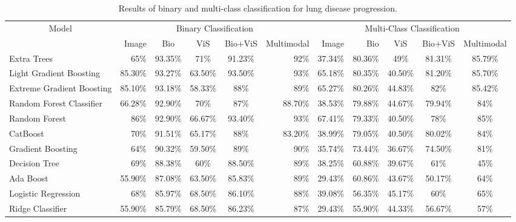 \documentclass[conference]{IEEEtran}
\begin{document}
\begin{table*}[]
\centering
\caption{Results of binary and multi-class classification for lung disease progression.}\label{binary_multi_mm}
\begin{tabular}{|l|r|c|c|c|r|r|r|c|c|c|}
\hline
\multicolumn{1}{|c|}{\multirow{2}{*}{Model}} & \multicolumn{5}{c|}{Binary Classification} & \multicolumn{5}{c|}{Multi-Class Classification} \\ \cline{2-11}  & Image & 
Bio & 
ViS & 
Bio+ViS & 
Multimodal & 
Image & 
Bio & 
ViS & 
Bio+ViS & 
Multimodal \\ \hline
Extra Trees \cite{geurts2006extremely} & 65\% & 93.35\% & 71\% & 91.23\% & 92\% & 37.34\% & 80.36\% & 49\% & 81.31\% & 85.79\% \\ \hline
Light Gradient Boosting \cite{hastie2009elements} & 85.30\% & 93.27\% & 63.50\% & 93.50\% & 93\% & 65.18\% & 80.35\% & 40.50\% & 81.20\% & 85.70\% \\ \hline
Extreme Gradient Boosting \cite{chen2016xgboost} & 85.10\% & 93.18\% & 58.33\% & 88\% & 89\% & 65.27\% & 80.26\% & 44.83\% & 82\% & 85.42\% \\ \hline
Random Forest Classifier & 66.28\% & 92.90\% & 70\% & 87\% & 88.70\% & 38.53\% & 79.88\% & 44.67\% & 79.94\% & 84\% \\ \hline
Random Forest \cite{breiman2001random} & 86\% & 92.90\% & 66.67\% & 93.40\% & 93\% & 67.41\% & 79.33\% & 40.50\% & 78\% & 85\% \\ \hline
CatBoost \cite{prokhorenkova2017catboost} & 70\% & 91.51\% & 65.17\% & 88\% & 83.20\% & 38.99\% & 79.05\% & 40.50\% & 80.02\% & 84\% \\ \hline
Gradient Boosting \cite{chen2016xgboost} & 64\% & 90.32\% & 59.50\% & 89\% & 90\% & 35.74\% & 73.44\% & 36.67\% & 74.50\% & 81\% \\ \hline
Decision Tree \cite{hastie2009elements} & 69\% & 88.38\% & 60\% & 88.50\% & 89\% & 38.25\% & 60.88\% & 39.67\% & 61\% & 45\% \\ \hline
Ada Boost \cite{hastie2009multi} & 55.90\% & 87.08\% & 63.50\% & 85.83\% & 89\% & 29.43\% & 60.86\% & 43.67\% & 50.17\% & 64\% \\ \hline
Logistic Regression \cite{defazio2014saga} & 68\% & 85.97\% & 68.50\% & 86.10\% & 88\% & 39.08\% & 56.35\% & 45.17\% & 60\% & 65\% \\ \hline
Ridge Classifier & 55.90\% & 85.79\% & 68.50\% & 86.23\% & 87\% & 29.43\% & 55.90\% & 44.33\% & 56.67\% & 57\% \\ \hline

\end{tabular}
\end{table*}
\end{document}
